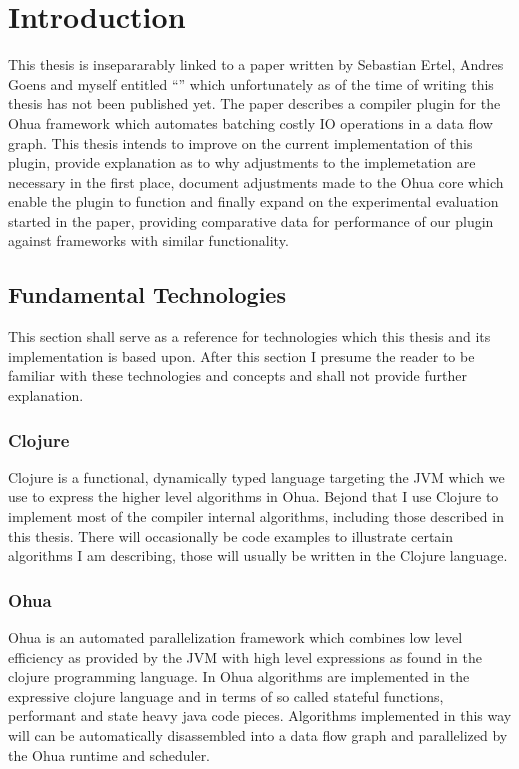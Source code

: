 
\chapter{Introduction} %

\label{ChapterIntro} %


This thesis is insepararably linked to a paper written by Sebastian Ertel, Andres Goens and myself entitled ``\yauhauPaperTitle{}'' which unfortunately as of the time of writing this thesis has not been published yet.
The paper describes a compiler plugin for the Ohua framework which automates batching costly IO operations in a data flow graph.
This thesis intends to improve on the current implementation of this plugin, provide explanation as to why adjustments to the implemetation are necessary in the first place, document adjustments made to the Ohua core which enable the plugin to function and finally expand on the experimental evaluation started in the paper, providing comparative data for performance of our plugin against frameworks with similar functionality.

\section{Fundamental Technologies}

This section shall serve as a reference for technologies which this thesis and its implementation is based upon.
After this section I presume the reader to be familiar with these technologies and concepts and shall not provide further explanation.

\subsection{Clojure}

Clojure is a functional, dynamically typed language targeting the JVM  which we use to express the higher level algorithms in Ohua.
Bejond that I use Clojure to implement most of the compiler internal algorithms, including those described in this thesis.
There will occasionally be code examples to illustrate certain algorithms I am describing, those will usually be written in the Clojure language.

\subsection{Ohua}

Ohua is an automated parallelization framework which combines low level efficiency as provided by the JVM with high level expressions as found in the clojure programming language.
In Ohua algorithms are implemented in the expressive clojure language and in terms of so called stateful functions, performant and state heavy java code pieces.
Algorithms implemented in this way will can be automatically disassembled into a data flow graph and parallelized by the Ohua runtime and scheduler.
